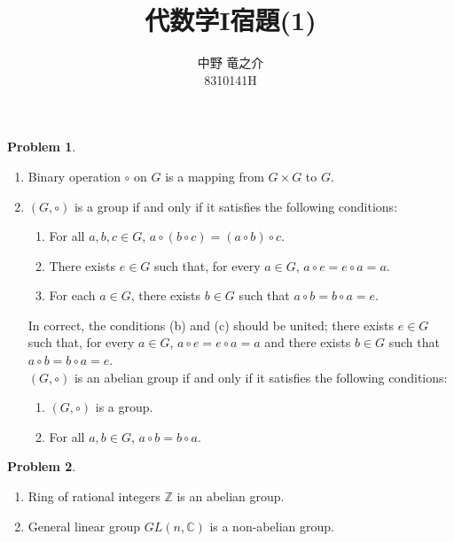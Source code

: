 \documentclass[a4paper, 12pt, fleqn, openany]{jsarticle}
\title{代数学I宿題(1)}
\author{中野 竜之介\\ 8310141H}
\theoremstyle{definition}
\newtheorem{prb}{Problem}
\begin{document}
\maketitle
\begin{prb}
    $ $
        \begin{enumerate}
                \item Binary operation $\circ$ on $G$ is a mapping from $G\times G$ to $G$.
            \item $(G,\circ)$ is a group if and only if it satisfies the following conditions:
                \begin{enumerate}
                    \item For all $a,b,c\in G$, $a\circ(b\circ c) = (a\circ b)\circ c$.
                    \item There exists $e \in G$ such that, for every $a \in G$, $a\circ e = e \circ a = a$.
                    \item For each $a \in G$, there exists $b \in G$ such that $a\circ b = b \circ a = e$.
                \end{enumerate}

            In correct, the conditions (b) and (c) should be united; there exists $e\in G$ such that, for every $a\in G$, $a\circ e = e \circ a = a$ and there exists $b\in G$ such that $a\circ b = b \circ a = e$.\\
                $ $\\
                $(G,\circ)$ is an abelian group if and only if it satisfies the following conditions:
                \begin{enumerate}
                    \item $(G,\circ)$ is a group.
                    \item For all $a,b \in G$, $a\circ b = b \circ a$.
                \end{enumerate}
    \end{enumerate}
\end{prb}

\begin{prb}
    $ $
    \begin{enumerate}
        \item Ring of rational integers $\mathbb{Z}$ is an abelian group.
        \item General linear group $GL(n,\mathbb{C})$ is a non-abelian group.
    \end{enumerate}
\end{prb}
\end{document}
